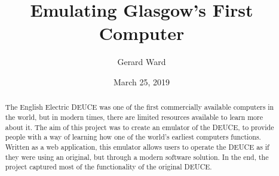 \documentclass{l4proj}
\begin{document}
\title{Emulating Glasgow's First Computer}
\author{Gerard Ward}
\date{March 25, 2019}

\maketitle

\begin{abstract}
    The English Electric DEUCE was one of the first commercially available computers in the world,
	but in modern times, there are limited resources available to learn more about it. The aim of
	this project was to create an emulator of the DEUCE, to provide people with a way of learning
	how one of the world's earliest computers functions. Written as a web application, this emulator
	allows users to operate the DEUCE as if they were using an original, but through a modern software
	solution. In the end, the project captured most of the functionality of the original DEUCE.
\end{abstract}


%
%
\def\consentname {Gerard Dominic Ward} %
\def\consentdate {20 March 2018} %
%
\educationalconsent


\tableofcontents
\end{document}

